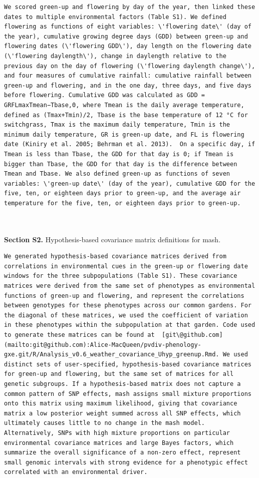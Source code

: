 \documentclass[
  letterpaper,
  DIV=11,
  numbers=noendperiod]{scrartcl}
\begin{document}
\begin{verbatim}
We scored green-up and flowering by day of the year, then linked these dates to multiple environmental factors (Table S1). We defined flowering as functions of eight variables: \'flowering date\' (day of the year), cumulative growing degree days (GDD) between green-up and flowering dates (\'flowering GDD\'), day length on the flowering date (\'flowering daylength\'), change in daylength relative to the previous day on the day of flowering (\'flowering daylength change\'), and four measures of cumulative rainfall: cumulative rainfall between green-up and flowering, and in the one day, three days, and five days before flowering. Cumulative GDD was calculated as GDD = GRFLmaxTmean−Tbase,0, where Tmean is the daily average temperature, defined as (Tmax+Tmin)/2, Tbase is the base temperature of 12 °C for switchgrass, Tmax is the maximum daily temperature, Tmin is the minimum daily temperature, GR is green-up date, and FL is flowering date (Kiniry et al. 2005; Behrman et al. 2013).  On a specific day, if Tmean is less than Tbase, the GDD for that day is 0; if Tmean is bigger than Tbase, the GDD for that day is the difference between Tmean and Tbase. We also defined green-up as functions of seven variables: \'green-up date\' (day of the year), cumulative GDD for the five, ten, or eighteen days prior to green-up, and the average air temperature for the five, ten, or eighteen days prior to green-up.

 
\end{verbatim}

\textbf{Section S2.} Hypothesis-based covariance matrix definitions for
mash.

\begin{verbatim}
We generated hypothesis-based covariance matrices derived from correlations in environmental cues in the green-up or flowering date windows for the three subpopulations (Table S1). These covariance matrices were derived from the same set of phenotypes as environmental functions of green-up and flowering, and represent the correlations between genotypes for these phenotypes across our common gardens. For the diagonal of these matrices, we used the coefficient of variation in these phenotypes within the subpopulation at that garden. Code used to generate these matrices can be found at  [git\@github.com](mailto:git@github.com):Alice-MacQueen/pvdiv-phenology-gxe.git/R/Analysis_v0.6_weather_covariance_Uhyp_greenup.Rmd. We used distinct sets of user-specified, hypothesis-based covariance matrices for green-up and flowering, but the same set of matrices for all genetic subgroups. If a hypothesis-based matrix does not capture a common pattern of SNP effects, mash assigns small mixture proportions onto this matrix using maximum likelihood, giving that covariance matrix a low posterior weight summed across all SNP effects, which ultimately causes little to no change in the mash model. Alternatively, SNPs with high mixture proportions on particular environmental covariance matrices and large Bayes factors, which summarize the overall significance of a non-zero effect, represent small genomic intervals with strong evidence for a phenotypic effect correlated with an environmental driver.
\end{verbatim}
\end{document}
